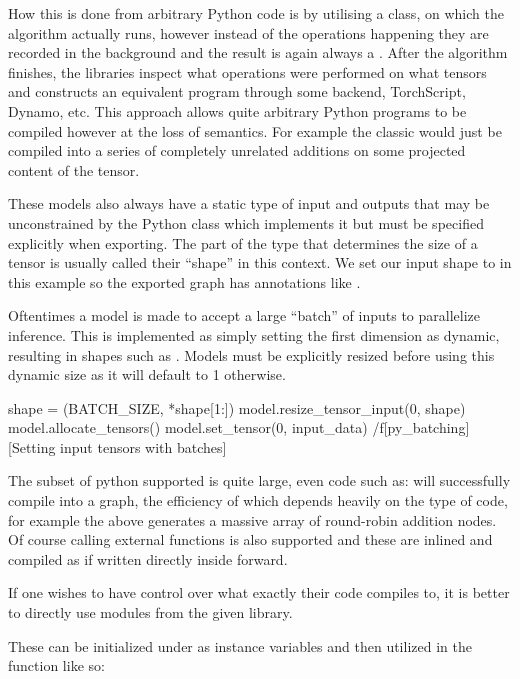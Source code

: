 How this is done from arbitrary Python code is by utilising
a  class,
on which the algorithm actually runs,
however instead of the operations
happening they are recorded in the background
and the result is again always a .
After the algorithm finishes,
the libraries inspect what operations were performed
on what tensors and constructs an equivalent program
through some backend, TorchScript, Dynamo, etc.
This approach allows quite arbitrary Python programs
to be compiled however at the loss of semantics.
For example the classic 
would just be compiled into a series of completely unrelated
additions on some projected content of the tensor.

These models also always have a static type of input and outputs
that may be unconstrained by the Python class which implements it
but must be specified explicitly when exporting.
The part of the type that determines the size of a tensor
is usually called their ``shape'' in this context.
We set our input shape to  in this example
so the exported graph has annotations like .

Oftentimes a model is made to accept a large ``batch'' of inputs
to parallelize inference.
This is implemented as simply
setting the first dimension as dynamic,
resulting in shapes such as .
Models must be explicitly resized before using this dynamic size
as it will default to 1 otherwise.

\midinsert
\begtt {}
shape = (BATCH_SIZE, *shape[1:])
model.resize_tensor_input(0, shape)
model.allocate_tensors()
model.set_tensor(0, input_data)
\endtt
\caplabel/f[py_batching][Setting input tensors with batches]
\endinsert

The subset of python supported is quite large,
even code such as:
\endtt
will successfully compile into a graph,
the efficiency of which depends heavily on
the type of code,
for example the above generates a massive
array of round-robin addition nodes.
Of course calling external functions is also supported
and these are inlined and compiled as if written
directly inside forward.

If one wishes to have control over what
exactly their code compiles to,
it is better to directly use modules from the given library.

These can be initialized under 
as instance variables and then utilized in
the  function like so:

